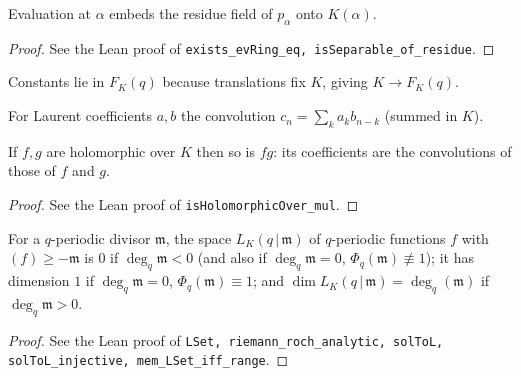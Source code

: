 \begin{lemma}
\label{lem:fq-residue-eval}
\leanok
Evaluation at $\alpha$ embeds the residue field of $p_\alpha$ onto $K(\alpha)$.
\end{lemma}
\begin{proof}
\leanok
See the Lean proof of \texttt{exists\_evRing\_eq, isSeparable\_of\_residue}.
\end{proof}

\begin{definition}
\label{def:Fq-algebra}
\leanok
Constants lie in $F_K(q)$ because translations fix $K$, giving $K\to F_K(q)$.
\end{definition}

\begin{definition}
\label{def:convolution}
\leanok
For Laurent coefficients $a,b$ the convolution $c_n=\sum_k a_k b_{n-k}$ (summed in $K$).
\end{definition}

\begin{lemma}
\label{lem:H-K-mul}
\leanok
If $f,g$ are holomorphic over $K$ then so is $fg$: its coefficients are the convolutions of those of $f$ and $g$.
\end{lemma}
\begin{proof}
\leanok
See the Lean proof of \texttt{isHolomorphicOver\_mul}.
\end{proof}

\begin{proposition}
\label{prop:abel-jacobi-2}
\leanok
For a $q$-periodic divisor $\mathfrak m$, the space $L_K(q\,|\,\mathfrak m)$ of $q$-periodic functions $f$ with $(f)\ge-\mathfrak m$ is $0$ if $\deg_q\mathfrak m<0$ (and also if $\deg_q\mathfrak m=0$, $\Phi_q(\mathfrak m)\not\equiv1$); it has dimension $1$ if $\deg_q\mathfrak m=0$, $\Phi_q(\mathfrak m)\equiv1$; and $\dim L_K(q\,|\,\mathfrak m)=\deg_q(\mathfrak m)$ if $\deg_q\mathfrak m>0$.
\end{proposition}
\begin{proof}
\leanok
See the Lean proof of \texttt{LSet, riemann\_roch\_analytic, solToL, solToL\_injective, mem\_LSet\_iff\_range}.
\end{proof}

